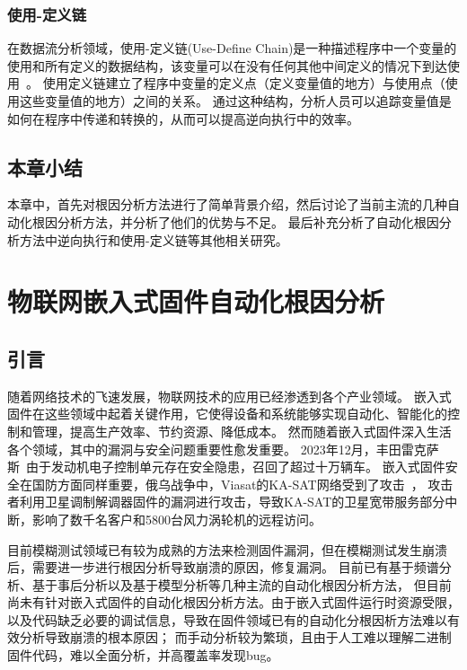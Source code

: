 \subsubsection{使用-定义链}
在数据流分析领域，使用-定义链(Use-Define Chain)是一种描述程序中一个变量的使用和所有定义的数据结构，该变量可以在没有任何其他中间定义的情况下到达使用~\cite{Compilers2007}。
使用定义链建立了程序中变量的定义点（定义变量值的地方）与使用点（使用这些变量值的地方）之间的关系。
通过这种结构，分析人员可以追踪变量值是如何在程序中传递和转换的，从而可以提高逆向执行中的效率。

\subsection{本章小结}
本章中，首先对根因分析方法进行了简单背景介绍，然后讨论了当前主流的几种自动化根因分析方法，并分析了他们的优势与不足。
最后补充分析了自动化根因分析方法中逆向执行和使用-定义链等其他相关研究。


\cleardoublepage
\section{物联网嵌入式固件自动化根因分析}    %
\subsection{引言}                         %
随着网络技术的飞速发展，物联网技术的应用已经渗透到各个产业领域。
嵌入式固件在这些领域中起着关键作用，它使得设备和系统能够实现自动化、智能化的控制和管理，提高生产效率、节约资源、降低成本。
然而随着嵌入式固件深入生活各个领域，其中的漏洞与安全问题重要性愈发重要。
2023年12月，丰田雷克萨斯~\cite{toyota}由于发动机电子控制单元存在安全隐患，召回了超过十万辆车。
嵌入式固件安全在国防方面同样重要，俄乌战争中，Viasat的KA-SAT网络受到了攻击~\cite{KASAT}，
攻击者利用卫星调制解调器固件的漏洞进行攻击，导致KA-SAT的卫星宽带服务部分中断，影响了数千名客户和5800台风力涡轮机的远程访问。

目前模糊测试领域已有较为成熟的方法来检测固件漏洞，但在模糊测试发生崩溃后，需要进一步进行根因分析导致崩溃的原因，修复漏洞。
目前已有基于频谱分析、基于事后分析以及基于模型分析等几种主流的自动化根因分析方法，
但目前尚未有针对嵌入式固件的自动化根因分析方法。由于嵌入式固件运行时资源受限，以及代码缺乏必要的调试信息，导致在固件领域已有的自动化分根因析方法难以有效分析导致崩溃的根本原因；
而手动分析较为繁琐，且由于人工难以理解二进制固件代码，难以全面分析，并高覆盖率发现bug。

